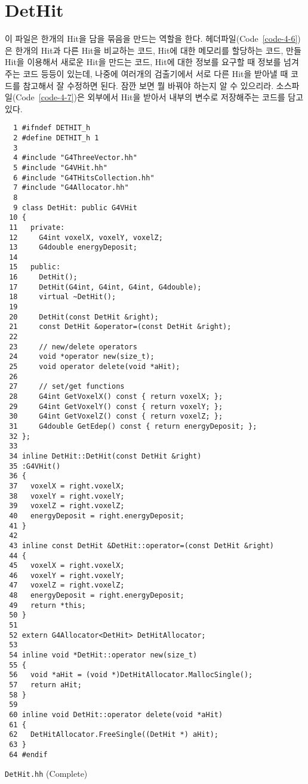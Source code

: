 \section{DetHit}
이 파일은 한개의 Hit을 담을 묶음을 만드는 역할을 한다.
헤더파일(Code~\ref{code-4-6})은 한개의 Hit과 다른 Hit을 비교하는 코드, Hit에
대한 메모리를 할당하는 코드, 만들 Hit을 이용해서 새로운 Hit을 만드는 코드,
Hit에 대한 정보를 요구할 때 정보를 넘겨주는 코드 등등이 있는데, 나중에 여러개의
검출기에서 서로 다른 Hit을 받아낼 때 코드를 참고해서 잘 수정하면 된다. 잠깐 보면
뭘 바꿔야 하는지 알 수 있으리라.  소스파일(Code~\ref{code-4-7})은 외부에서 Hit을
받아서 내부의 변수로 저장해주는 코드를 담고있다.

\begin{code}[p]
\begin{lstlisting}
  1 #ifndef DETHIT_h
  2 #define DETHIT_h 1
  3 
  4 #include "G4ThreeVector.hh"
  5 #include "G4VHit.hh"
  6 #include "G4THitsCollection.hh"
  7 #include "G4Allocator.hh"
  8 
  9 class DetHit: public G4VHit
 10 {
 11   private:
 12     G4int voxelX, voxelY, voxelZ;
 13     G4double energyDeposit;
 14 
 15   public:
 16     DetHit();
 17     DetHit(G4int, G4int, G4int, G4double);
 18     virtual ~DetHit();
 19 
 20     DetHit(const DetHit &right);
 21     const DetHit &operator=(const DetHit &right);
 22 
 23     // new/delete operators
 24     void *operator new(size_t);
 25     void operator delete(void *aHit);
 26 
 27     // set/get functions
 28     G4int GetVoxelX() const { return voxelX; };
 29     G4int GetVoxelY() const { return voxelY; };
 30     G4int GetVoxelZ() const { return voxelZ; };
 31     G4double GetEdep() const { return energyDeposit; };
 32 };
 33 
 34 inline DetHit::DetHit(const DetHit &right)
 35 :G4VHit()
 36 {
 37   voxelX = right.voxelX;
 38   voxelY = right.voxelY;
 39   voxelZ = right.voxelZ;
 40   energyDeposit = right.energyDeposit;
 41 }
 42 
 43 inline const DetHit &DetHit::operator=(const DetHit &right)
 44 {
 45   voxelX = right.voxelX;
 46   voxelY = right.voxelY;
 47   voxelZ = right.voxelZ;
 48   energyDeposit = right.energyDeposit;
 49   return *this;
 50 }
 51 
 52 extern G4Allocator<DetHit> DetHitAllocator;
 53 
 54 inline void *DetHit::operator new(size_t)
 55 {
 56   void *aHit = (void *)DetHitAllocator.MallocSingle();
 57   return aHit;
 58 }
 59 
 60 inline void DetHit::operator delete(void *aHit)
 61 {
 62   DetHitAllocator.FreeSingle((DetHit *) aHit);
 63 }
 64 #endif
\end{lstlisting}
\caption{\texttt{DetHit.hh} (Complete) \label{code-4-7}}
\end{code}

